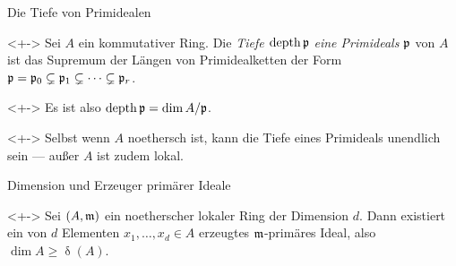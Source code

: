 \begin{frame}{Die Tiefe von Primidealen}
	\begin{definition}<+->
		Sei \(A\) ein kommutativer Ring. Die \emph{Tiefe \(\operatorname{depth} \mathfrak{p}\) eine Primideals \(\mathfrak{p}\)} von
		\(A\) ist das Supremum der Längen von Primidealketten der Form \(\mathfrak{p} = \mathfrak{p}_0 \subsetneq \mathfrak{p}_1
		\subsetneq \dotsb \subsetneq \mathfrak{p}_r\).
	\end{definition}
	\begin{visibleenv}<+->
		Es ist also \(\operatorname{depth} \mathfrak{p} = \dim A/\mathfrak{p}\).
	\end{visibleenv}
	\begin{remark}<+->
		Selbst wenn \(A\) noethersch ist, kann die Tiefe eines  Primideals unendlich sein --- außer \(A\) ist zudem lokal.
	\end{remark}
\end{frame}

\begin{frame}{Dimension und Erzeuger primärer Ideale}
	\begin{proposition}<+->
		Sei \((A, \mathfrak{m})\) ein noetherscher lokaler Ring der Dimension \(d\). Dann existiert ein von
		\(d\) Elementen \(x_1, \dotsc, x_d \in A\) erzeugtes \(\mathfrak{m}\)-primäres Ideal, also \(\dim A \ge \updelta(A)\).
	\end{proposition}
\end{frame}

